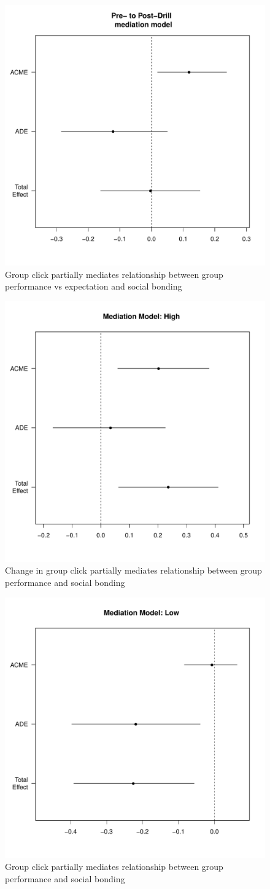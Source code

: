 \begin{figure}
  \centering
  \includegraphics[width=0.5\linewidth,keepaspectratio] {images/groupPerfExpClickChangeMedPlot}
  \caption{Group click partially mediates relationship between group performance vs expectation and social bonding}
  \label{fig:groupPerfExpClickChangeMedPlot}
\end{figure}

\begin{figure}
  \centering
  \includegraphics[width=0.5\linewidth,keepaspectratio] {images/groupPerfClickChangeMedPlotHigh}
  \caption{Change in group click partially mediates relationship between group performance and social bonding}
  \label{fig:groupPerfClickChangeMedPlotHigh}
\end{figure}

\begin{figure}
  \centering
  \includegraphics[width=0.5\linewidth,keepaspectratio] {images/groupPerfClickChangeMedPlotLow}
  \caption{Group click partially mediates relationship between group performance and social bonding}
  \label{fig:prePostExperimentChangePlotLow}
\end{figure}





